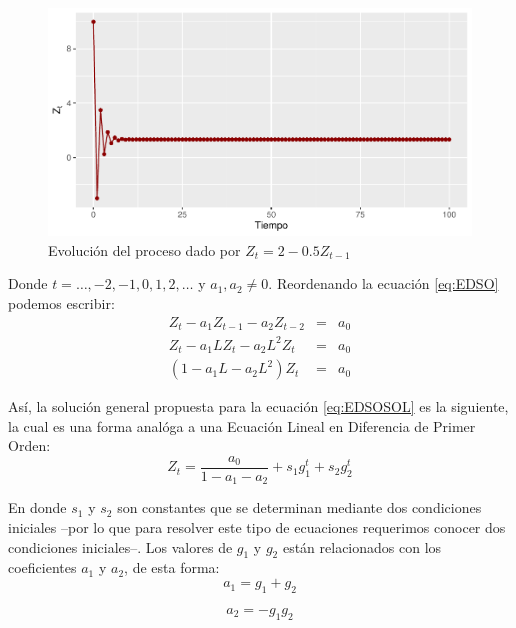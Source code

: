 \documentclass[
]{book}
\begin{document}
\begin{figure}

{\centering \includegraphics{bookdown-demo_files/figure-latex/fig22-1} 

}

\caption{Evolución del proceso dado por $Z_t =2-0.5Z_{t-1}$}\label{fig:fig22}
\end{figure}

Donde \(t = \ldots, -2, -1, 0, 1, 2, \ldots\) y \(a_1, a_2 \neq 0\). Reordenando la ecuación \eqref{eq:EDSO} podemos escribir:
\begin{eqnarray}
    Z_t - a_1 Z_{t-1} - a_2 Z_{t-2} & = & a_0 \nonumber \\
    Z_t - a_1 L Z_{t} - a_2 L^2 Z_{t} & = & a_0 \nonumber \\
    (1 - a_1 L - a_2 L^2)Z_t & = & a_0 
    \label{eq:EDSOSOL}
\end{eqnarray}

Así, la solución general propuesta para la ecuación \eqref{eq:EDSOSOL} es la siguiente, la cual es una forma analóga a una Ecuación Lineal en Diferencia de Primer Orden:
\begin{equation}
    Z_t = \frac{a_0}{1 - a_1 - a_2} + s_1 g^t_1 + s_2 g^t_2
    \label{eq:SOLGEN2}
\end{equation}

En donde \(s_1\) y \(s_2\) son constantes que se determinan mediante dos condiciones iniciales --por lo que para resolver este tipo de ecuaciones requerimos conocer dos condiciones iniciales--. Los valores de \(g_1\) y \(g_2\) están relacionados con los coeficientes \(a_1\) y \(a_2\), de esta forma:
\begin{equation}
  a_1  =  g_1 + g_2
  \label{eq:a1}
\end{equation}

\begin{equation}
    a_2  =  - g_1 g_2
    \label{eq:a2}
\end{equation}
\end{document}
